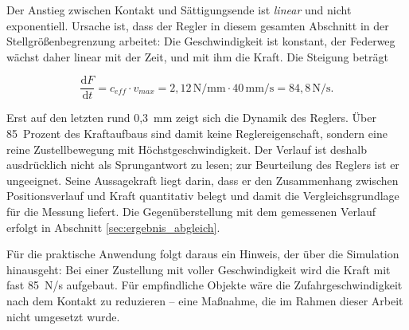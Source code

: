Der Anstieg zwischen Kontakt und Sättigungsende ist \emph{linear} und nicht
exponentiell. Ursache ist, dass der Regler in diesem gesamten Abschnitt in der
Stellgrößenbegrenzung arbeitet: Die Geschwindigkeit ist konstant, der Federweg wächst
daher linear mit der Zeit, und mit ihm die Kraft. Die Steigung beträgt

\begin{equation}
    \frac{\mathrm{d}F}{\mathrm{d}t} = c_{eff} \cdot v_{max}
    = 2{,}12\,\mathrm{N/mm} \cdot 40\,\mathrm{mm/s} = 84{,}8\,\mathrm{N/s} .
    \label{eq:kraftanstieg}
\end{equation}

Erst auf den letzten rund 0,3~mm zeigt sich die Dynamik des Reglers. Über 85~Prozent des
Kraftaufbaus sind damit keine Reglereigenschaft, sondern eine reine Zustellbewegung mit
Höchstgeschwindigkeit. Der Verlauf ist deshalb ausdrücklich nicht als Sprungantwort zu
lesen; zur Beurteilung des Reglers ist er ungeeignet. Seine Aussagekraft liegt darin, dass
er den Zusammenhang zwischen Positionsverlauf und Kraft quantitativ belegt und damit die
Vergleichsgrundlage für die Messung liefert. Die Gegenüberstellung mit dem gemessenen
Verlauf erfolgt in Abschnitt \ref{sec:ergebnis_abgleich}.

Für die praktische Anwendung folgt daraus ein Hinweis, der über die Simulation
hinausgeht: Bei einer Zustellung mit voller Geschwindigkeit wird die Kraft mit fast
85~N/s aufgebaut. Für empfindliche Objekte wäre die Zufahrgeschwindigkeit nach dem
Kontakt zu reduzieren -- eine Maßnahme, die im Rahmen dieser Arbeit nicht umgesetzt wurde.